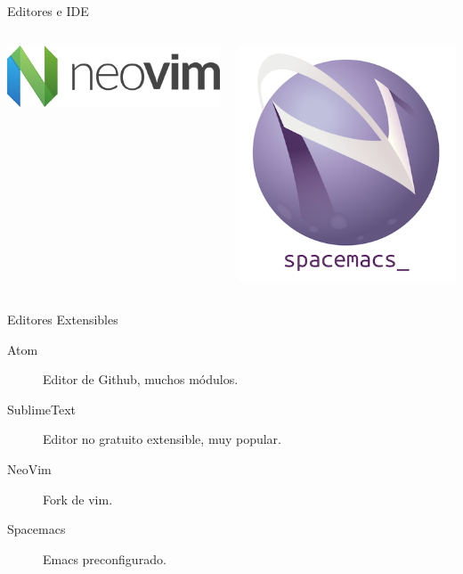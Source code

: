 \documentclass[bigger,unknownkeysallowed]{beamer}
\begin{document}
\begin{frame}[label={sec:orgb5d527d}]{Editores e IDE}
\begin{columns}
\begin{column}{0.2\columnwidth}
\begin{center}
\includegraphics[width=\textwidth]{neovim.png}
\end{center}
\end{column}

\begin{column}{0.15\columnwidth}
\begin{center}
\includegraphics[width=\textwidth]{spacemacs.png}
\end{center}
\end{column}
\end{columns}

\begin{block}{Editores Extensibles}
\begin{description}
\item[{Atom}] Editor de Github, muchos módulos.
\item[{SublimeText}] Editor no gratuito extensible, muy popular.
\item[{NeoVim}] Fork de vim.
\item[{Spacemacs}] Emacs preconfigurado.
\end{description}
\end{block}


\end{frame}
\end{document}
